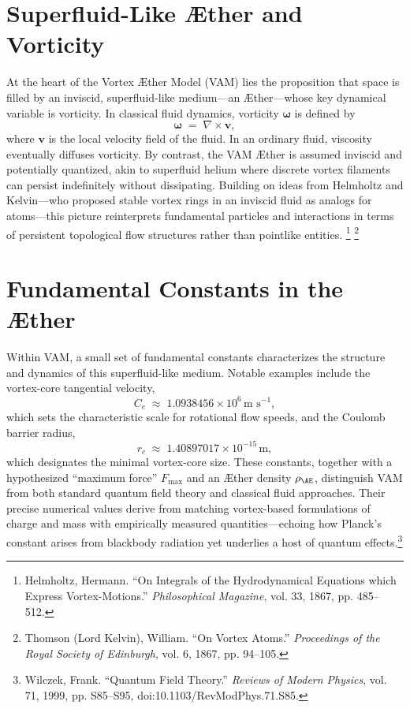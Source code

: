 
\section{Superfluid-Like Æther and Vorticity}

At the heart of the Vortex Æther Model (VAM) lies the proposition that space is filled by an inviscid, superfluid-like medium—an Æther—whose key dynamical variable is vorticity. In classical fluid dynamics, vorticity \(\boldsymbol{\omega}\) is defined by
\[
    \boldsymbol{\omega} \;=\; \nabla \times \mathbf{v},
\]
where \(\mathbf{v}\) is the local velocity field of the fluid. In an ordinary fluid, viscosity eventually diffuses vorticity. By contrast, the VAM Æther is assumed inviscid and potentially quantized, akin to superfluid helium where discrete vortex filaments can persist indefinitely without dissipating. Building on ideas from Helmholtz and Kelvin—who proposed stable vortex rings in an inviscid fluid as analogs for atoms—this picture reinterprets fundamental particles and interactions in terms of persistent topological flow structures rather than pointlike entities.
\footnote{Helmholtz, Hermann. “On Integrals of the Hydrodynamical Equations which Express Vortex-Motions.” \textit{Philosophical Magazine}, vol. 33, 1867, pp. 485–512.}
\footnote{Thomson (Lord Kelvin), William. “On Vortex Atoms.” \textit{Proceedings of the Royal Society of Edinburgh}, vol. 6, 1867, pp. 94–105.}

\section{Fundamental Constants in the Æther}

Within VAM, a small set of fundamental constants characterizes the structure and dynamics of this superfluid-like medium. Notable examples include the vortex-core tangential velocity,
\[
    C_{e} \;\approx\; 1.0938456 \times 10^{6} \, \text{m s}^{-1},
\]
which sets the characteristic scale for rotational flow speeds, and the Coulomb barrier radius,
\[
    r_{c} \;\approx\; 1.40897017 \times 10^{-15} \, \text{m},
\]
which designates the minimal vortex-core size. These constants, together with a hypothesized “maximum force” \(F_{\max}\) and an Æther density \(\rho_{\mathrm{\AE}}\), distinguish VAM from both standard quantum field theory and classical fluid approaches. Their precise numerical values derive from matching vortex-based formulations of charge and mass with empirically measured quantities—echoing how Planck’s constant arises from blackbody radiation yet underlies a host of quantum effects.\footnote{Wilczek, Frank. “Quantum Field Theory.” \textit{Reviews of Modern Physics}, vol. 71, 1999, pp. S85–S95, doi:10.1103/RevModPhys.71.S85.}

